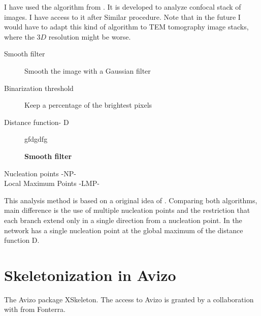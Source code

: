  I have used the algorithm from \citep{stein_algorithm_2008}. It is developed to
 analyze confocal stack of images. I have access to it after  Similar procedure.
 Note that in the future I would have to adapt this kind of algorithm to TEM
 tomography image stacks, where the $3D$ resolution might be worse. 
 \begin{description}
 \item[Smooth filter] Smooth the image with a Gaussian filter
 \item[Binarization threshold] Keep a percentage of the brightest pixels
 \item[Distance function- D] gfdgdfg
 
 \subitem \textbf{Smooth filter}
 \item[Nucleation points -NP-]
 \item[Local Maximum Points -LMP-]
 \end{description}
     
This analysis method \citep{stein_algorithm_2008} is based on a original idea of
\citet{wu_automated_2003}. Comparing both
algorithms, \citet{stein_algorithm_2008} main difference is the use of
multiple nucleation points and the restriction that each branch extend only in a single direction from a nucleation
point. In \citet{wu_automated_2003} the network has a single nucleation point 
at the global maximum of the distance function D.


\section{Skeletonization in Avizo}
The Avizo package XSkeleton. The access to Avizo is granted by a collaboration
with from Fonterra.

